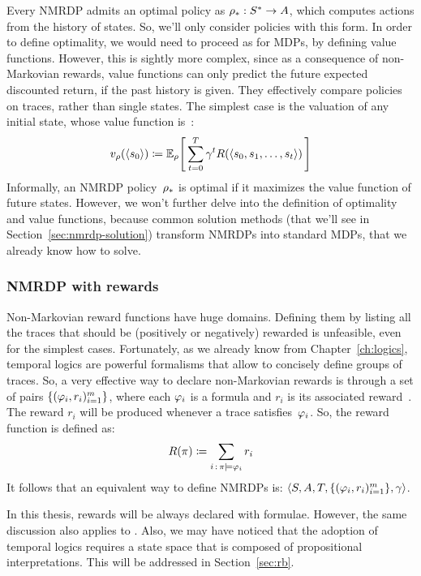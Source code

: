 Every NMRDP admits an optimal policy as ${{\rho}_*: S^* \to A}$, which
computes actions from the history of states. So, we'll only consider policies
with this form. In order to define optimality, we would need to proceed as for
MDPs, by defining value functions. However, this is sightly more complex,
since as a consequence of non-Markovian rewards, value functions can
only predict the future expected discounted return, if the past history is
given. They effectively compare policies on traces, rather than single
states. The simplest case is the valuation of any initial state, whose value
function is~\cite{bib:nmrdp-logic-first}:
\begin{equation}
	v_{\rho}(\langle s_0 \rangle) \coloneqq \mathbb{E}_{\rho} \Biggl[\,
		\sum_{t=0}^{T} \gamma^t R(\langle s_0, s_1, \dots, s_t \rangle)
		\,\Biggr]
\end{equation}
Informally, an NMRDP policy~${\rho}_*$ is optimal if it maximizes the
value function of future states. However, we won't further delve into the
definition of optimality and value functions, because common solution methods
(that we'll see in Section~\ref{sec:nmrdp-solution}) transform NMRDPs into
standard MDPs, that we already know how to solve.


\subsubsection*{NMRDP with \ldl{} rewards}

Non-Markovian reward functions have huge domains. Defining them by listing all
the traces that should be (positively or negatively) rewarded is unfeasible,
even for the simplest cases. Fortunately, as we already know from
Chapter~\ref{ch:logics}, temporal logics are powerful formalisms that allow to
concisely define groups of traces. So, a very effective way to declare
non-Markovian rewards is through a set of pairs $\{(\varphi_i,
r_i)_{i=1}^m\}$, where each $\varphi_i$ is a \ldl{} formula and $r_i$ is its
associated reward~\cite{bib:degiacomo-logic-nmrdp}. The reward $r_i$ will be
produced whenever a trace satisfies~$\varphi_i$. So, the reward function is
defined as:
\begin{equation}
	R(\pi) \coloneqq \sum_{i \,:\, \pi \models \varphi_i} r_i
	\label{eq:ldlf-rewards}
\end{equation}
It follows that an equivalent way to define NMRDPs is: $\langle S, A, T,
\{(\varphi_i, r_i)_{i=1}^m\}, \gamma \rangle$.

In this thesis, rewards will be always declared with \ldl{} formulae. However,
the same discussion also applies to \ltl{}. Also, we may have noticed that the
adoption of temporal logics requires a state space that is composed of
propositional interpretations. This will be addressed in Section~\ref{sec:rb}.


